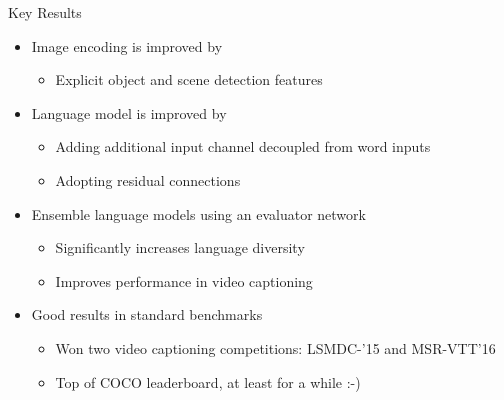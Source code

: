 \documentclass{beamer}
\begin{document}
\begin{frame}{Key Results}
\begin{itemize}
\item Image encoding is improved by
    \begin{itemize}
        \item Explicit object and scene detection features
    \end{itemize}
\item Language model is improved by 
    \begin{itemize}
        \item Adding additional input channel decoupled from word inputs
        \item Adopting residual connections 
    \end{itemize}
\item Ensemble language models using an evaluator network
    \begin{itemize}
        \item Significantly increases language diversity
        \item Improves performance in video captioning
    \end{itemize}
\item Good results in standard benchmarks
    \begin{itemize}
        \item Won two video captioning competitions: LSMDC-'15 and MSR-VTT'16 
        \item Top of COCO leaderboard, at least for a while :-) 
    \end{itemize}
\end{itemize}
\end{frame}

\end{document}

